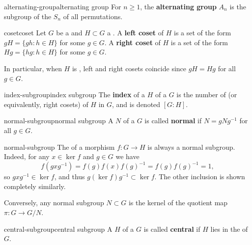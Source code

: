 \begin{topic}{alternating-group}{alternating group}
    For $n \ge 1$, the \textbf{alternating group} $A_n$ is the subgroup of the  $S_n$ of all  permutations.
\end{topic}

\begin{topic}{coset}{coset}
    Let $G$ be a  and $H \subset G$ a . A \textbf{left coset} of $H$ is a set of the form $gH = \{ gh : h \in H \}$ for some $g \in G$. A \textbf{right coset} of $H$ is a set of the form $Hg = \{ hg : h \in H \}$ for some $g \in G$.
    
    In particular, when $H$ is , left and right cosets coincide since $gH = Hg$ for all $g \in G$.
\end{topic}

\begin{topic}{index-subgroup}{index subgroup}
    The \textbf{index} of a  $H$ of a  $G$ is the number of  (or equivalently, right cosets) of $H$ in $G$, and is denoted $[G : H]$.
\end{topic}

\begin{topic}{normal-subgroup}{normal subgroup}
    A  $N$ of a  $G$ is called \textbf{normal} if $N = g N g^{-1}$ for all $g \in G$.
\end{topic}

\begin{example}{normal-subgroup}
    The  of a morphism $f : G \to H$ is always a normal subgroup. Indeed, for any $x \in \ker f$ and $g \in G$ we have
    \[ f(gxg^{-1}) = f(g) f(x) f(g)^{-1} = f(g) f(g)^{-1} = 1 , \]
    so $gxg^{-1} \in \ker f$, and thus $g (\ker f) g^{-1} \subset \ker f$. The other inclusion is shown completely similarly.
    
    Conversely, any normal subgroup $N \subset G$ is the kernel of the quotient map $\pi : G \to G / N$.
\end{example}

\begin{topic}{central-subgroup}{central subgroup}
    A  $H$ of a  $G$ is called \textbf{central} if $H$ lies in the  of $G$.
\end{topic}

